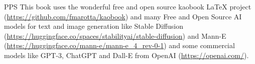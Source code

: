 PPS This book uses the wonderful free and open source kaobook LaTeX project (\url{https://github.com/fmarotta/kaobook}) and  many Free and Open Source AI  models for text and image generation like Stable Diffusion (\url{https://huggingface.co/spaces/stabilityai/stable-diffusion}) and Mann-E (\url{https://huggingface.co/mann-e/mann-e_4_rev-0-1}) and some commercial models like GPT-3, ChatGPT and Dall-E from OpenAI (\url{https://openai.com/}).

